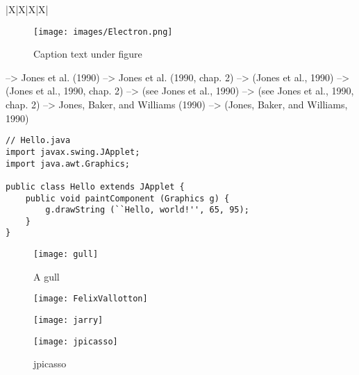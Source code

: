 \begin{table}[h]
\begin{tabu}{|X|X|X|X|}
\begin{figure}[!htb] %
\centering %
\texttt{[image: images/Electron.png]}
\caption[Text for Table of Contents]{Caption text under figure}
\label{fig:Electron}
\end{figure}

\citet{jon90}	               -->    	Jones et al. (1990)
\citet[chap. 2]{jon90}	     -->    	Jones et al. (1990, chap. 2)
\citep{jon90}	               -->    	(Jones et al., 1990)
\citep[chap. 2]{jon90}	     -->    	(Jones et al., 1990, chap. 2)
\citep[see][]{jon90}	       -->    	(see Jones et al., 1990)
\citep[see][chap. 2]{jon90}	 -->    	(see Jones et al., 1990, chap. 2)
\citet*{jon90}	             -->    	Jones, Baker, and Williams (1990)
\citep*{jon90}	             -->    	(Jones, Baker, and Williams, 1990)




\begin{lstlisting}
// Hello.java
import javax.swing.JApplet;
import java.awt.Graphics;

public class Hello extends JApplet {
    public void paintComponent (Graphics g) {
        g.drawString (``Hello, world!'', 65, 95);
    }
}
\end{lstlisting}

\begin{wrapfigure}{r}{0.5\textwidth}
  \begin{center}
    \texttt{[image: gull]}
  \end{center}
  \caption{A gull}
\end{wrapfigure}

\begin{figure}
\centering
\begin{minipage}{.275\linewidth}
  \texttt{[image: FelixVallotton]}
  \caption[figure1]{FelixVallotton}
\label{img1}
\end{minipage}
\hspace{.05\linewidth}
\begin{minipage}{.275\linewidth}
  \texttt{[image: jarry]}
  \caption[figure2]{jarry}
\label{img2}
\end{minipage}
\hspace{.05\linewidth}
\begin{minipage}{.275\linewidth}
  \texttt{[image: jpicasso]}
  \caption[figure3]{jpicasso}
\label{img3}
\end{minipage}
\end{figure}



\end{tabu}
\end{table}
